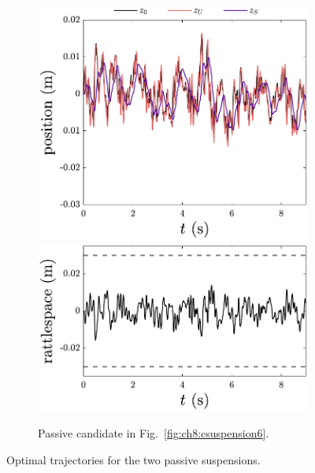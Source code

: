 \begin{figure}
\begin{subfigure}[b]{0.5\textwidth}
\includegraphics[width=\textwidth]{../ch8/figures/design6-position}
\includegraphics[width=\textwidth]{../ch8/figures/design6-rattlespace}
\caption{Passive candidate in Fig.~\ref{fig:ch8:csuspension6}.\label{fig:ch8:results6}}
\end{subfigure}%

\caption{Optimal trajectories for the two passive suspensions.}

\end{figure}

